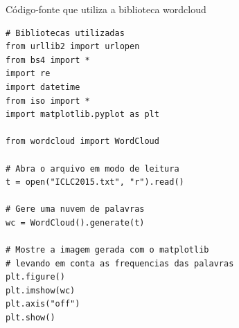 \begin{example}{Código-fonte que utiliza a biblioteca wordcloud}  
\begin{verbatim}
# Bibliotecas utilizadas
from urllib2 import urlopen
from bs4 import *
import re
import datetime
from iso import *
import matplotlib.pyplot as plt

from wordcloud import WordCloud
    
# Abra o arquivo em modo de leitura
t = open("ICLC2015.txt", "r").read()

# Gere uma nuvem de palavras
wc = WordCloud().generate(t)
    
# Mostre a imagem gerada com o matplotlib
# levando em conta as frequencias das palavras
plt.figure()
plt.imshow(wc)
plt.axis("off")
plt.show()
\end{verbatim}
\label{cod:nuvem}
\end{example}